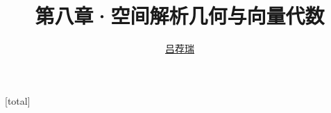 \documentclass[14pt,notheorems,leqno,xcolor={rgb}]{beamer} %
\begin{document}

[total]

\title{第八章·空间解析几何与向量代数}
\author{\href{https://lvjr.bitbucket.io}{吕荐瑞}}

\begin{frame}[plain]
\titlepage
\end{frame}

%
%
%
%
%
%








%
%
%
\end{document}
